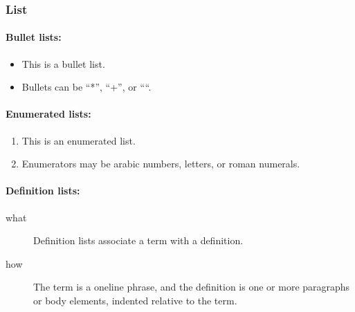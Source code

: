 \documentclass[a4paper,10pt,english]{report}
\begin{document}
\subsubsection{List}
\label{\detokenize{prirucnik/evidencija:list}}

\paragraph{Bullet lists:}
\label{\detokenize{prirucnik/evidencija:bullet-lists}}\begin{itemize}
\item {} 
This is a bullet list.

\item {} 
Bullets can be “*”, “+”, or “\sphinxhyphen{}“.

\end{itemize}


\paragraph{Enumerated lists:}
\label{\detokenize{prirucnik/evidencija:enumerated-lists}}\begin{enumerate}
%
\item {} 
This is an enumerated list.

\item {} 
Enumerators may be arabic numbers, letters, or roman
numerals.

\end{enumerate}


\paragraph{Definition lists:}
\label{\detokenize{prirucnik/evidencija:definition-lists}}\begin{description}
\item[{what}] \leavevmode
Definition lists associate a term with a definition.

\item[{how}] \leavevmode
The term is a one\sphinxhyphen{}line phrase, and the definition is one
or more paragraphs or body elements, indented relative to
the term.

\end{description}
\end{document}
